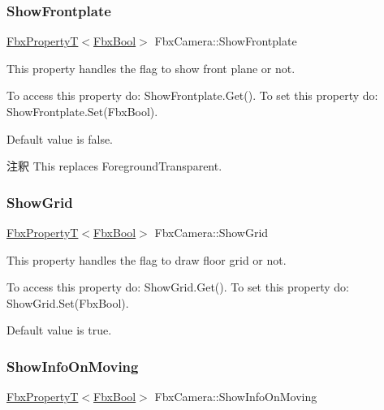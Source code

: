 \subsubsection{\texorpdfstring{Show\+Frontplate}{ShowFrontplate}}
{\footnotesize\ttfamily \hyperlink{class_fbx_property_t}{Fbx\+PropertyT}$<$\hyperlink{fbxtypes_8h_a92e0562b2fe33e76a242f498b362262e}{Fbx\+Bool}$>$ Fbx\+Camera\+::\+Show\+Frontplate}

This property handles the flag to show front plane or not.

To access this property do\+: Show\+Frontplate.\+Get(). To set this property do\+: Show\+Frontplate.\+Set(\+Fbx\+Bool).

Default value is false. \begin{DoxyRemark}{注釈}
This replaces Foreground\+Transparent. 
\end{DoxyRemark}
\mbox{\label{class_fbx_camera_ac44b2aec0ace4b978979e5bd3f9cd384}} 
\subsubsection{\texorpdfstring{Show\+Grid}{ShowGrid}}
{\footnotesize\ttfamily \hyperlink{class_fbx_property_t}{Fbx\+PropertyT}$<$\hyperlink{fbxtypes_8h_a92e0562b2fe33e76a242f498b362262e}{Fbx\+Bool}$>$ Fbx\+Camera\+::\+Show\+Grid}

This property handles the flag to draw floor grid or not.

To access this property do\+: Show\+Grid.\+Get(). To set this property do\+: Show\+Grid.\+Set(\+Fbx\+Bool).

Default value is true. \mbox{\label{class_fbx_camera_a15b36db580c994a2676fd18d41923953}} 
\subsubsection{\texorpdfstring{Show\+Info\+On\+Moving}{ShowInfoOnMoving}}
{\footnotesize\ttfamily \hyperlink{class_fbx_property_t}{Fbx\+PropertyT}$<$\hyperlink{fbxtypes_8h_a92e0562b2fe33e76a242f498b362262e}{Fbx\+Bool}$>$ Fbx\+Camera\+::\+Show\+Info\+On\+Moving}

